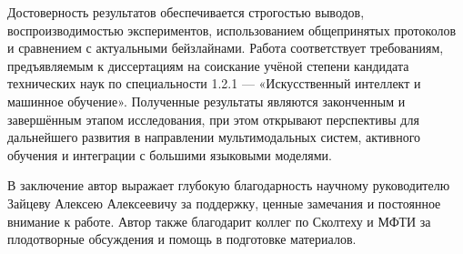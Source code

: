Достоверность результатов обеспечивается строгостью выводов, воспроизводимостью экспериментов, использованием общепринятых протоколов и сравнением с актуальными бейзлайнами. 
Работа соответствует требованиям, предъявляемым к диссертациям на соискание учёной степени кандидата технических наук по специальности 1.2.1 — «Искусственный интеллект и машинное обучение».
Полученные результаты являются законченным и завершённым этапом исследования, при этом открывают перспективы для дальнейшего развития в направлении мультимодальных систем, активного обучения и интеграции с большими языковыми моделями.  

В заключение автор выражает глубокую благодарность научному руководителю Зайцеву Алексею Алексеевичу за поддержку, ценные замечания и постоянное внимание к работе.
Автор также благодарит коллег по Сколтеху и МФТИ за плодотворные обсуждения и помощь в подготовке материалов.
